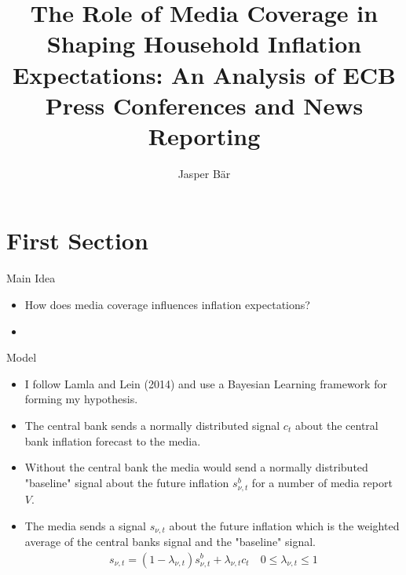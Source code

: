 \documentclass[aspectratio=169,xcolor=dvipsnames]{beamer}
\title{The Role of Media Coverage in Shaping Household Inflation Expectations: An Analysis of ECB Press Conferences and News Reporting}
\author[authors] {Jasper Bär}
\begin{document}
\begin{frame}
    \titlepage
\end{frame}

\section{First Section}

\begin{frame}{Main Idea}

\begin{itemize}
	\item How does media coverage influences inflation expectations?
	\item 
\end{itemize}

\end{frame}


\begin{frame}{Model}

\begin{itemize}
	\item I follow Lamla and Lein (2014) and use a Bayesian Learning framework for forming my hypothesis.
	\item The central bank sends a normally distributed signal $c_t$ about the central bank inflation forecast to the media.
	\item Without the central bank the media would send a normally distributed "baseline" signal about the future inflation $s_{\nu,t}^b$ for a number of media report $V$. 
	\item The media sends a signal $s_{\nu,t}$ about the future inflation which is the weighted average of the central banks signal and the "baseline" signal. 
	\begin{align*}
s_{\nu,t} = (1-\lambda_{\nu,t}) s^b_{\nu,t} + \lambda_{\nu,t} c_t \quad 0\leq \lambda_{\nu,t} \leq 1 \\
\end{align*}
\end{itemize}

\end{frame}

\end{document}
